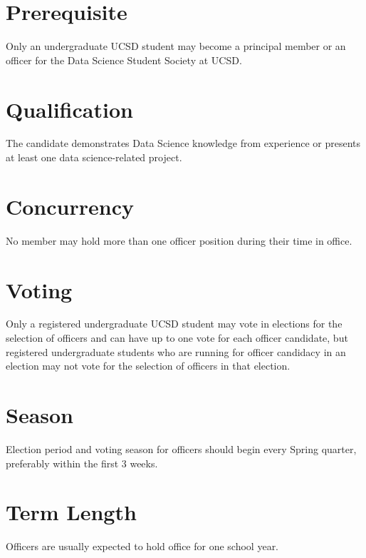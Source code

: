 \documentclass[12pt]{constitution}
\begin{document}

\section{Prerequisite}Only an undergraduate UCSD student may become a principal member or an officer for the Data Science Student Society at UCSD.

\section{Qualification} The candidate demonstrates Data Science knowledge from experience or presents at least one data science-related project.

\section{Concurrency} No member may hold more than one officer position during their time in office. 

\section{Voting} Only a registered undergraduate UCSD student may vote in elections for the selection of officers and can have up to one vote for each officer candidate, but registered undergraduate students who are running for officer candidacy in an election may not vote for the selection of officers in that election.

\section{Season} Election period and voting season for officers should begin every Spring quarter, preferably within the first 3 weeks.

\section{Term Length} Officers are usually expected to hold office for one school year.
\end{document}
